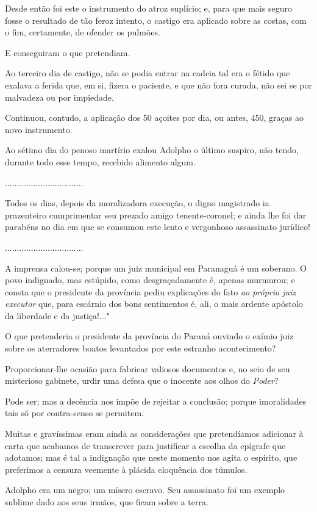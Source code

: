 Desde então foi este o instrumento do atroz suplício; e, para que mais
seguro fosse o resultado de tão feroz intento, o castigo era aplicado
sobre as costas, com o fim, certamente, de ofender os pulmões.

E conseguiram o que pretendiam.

Ao terceiro dia de castigo, não se podia entrar na cadeia tal era o
fétido que exalava a ferida que, em si, fizera o paciente, e que não
fora curada, não sei se por malvadeza ou por impiedade.

Continuou, contudo, a aplicação dos 50 açoites por dia, ou antes, 450,
graças ao novo instrumento.

Ao sétimo dia do penoso martírio exalou Adolpho o último suspiro, não
tendo, durante todo esse tempo, recebido alimento algum.

.................................

Todos os dias, depois da moralizadora execução, o digno magistrado ia
prazenteiro cumprimentar seu prezado amigo tenente-coronel; e ainda lhe
foi dar parabéns no dia em que se consumou este lento e vergonhoso
assassinato jurídico!

.................................

A imprensa calou-se; porque um juiz municipal em Paranaguá é um
soberano. O povo indignado, mas estúpido, como desgraçadamente é, apenas
murmurou; e consta que o presidente da província pediu explicações do
fato \emph{ao próprio juiz executor} que, para escárnio dos bons
sentimentos é, ali, o mais ardente apóstolo da liberdade e da
justiça!..."

O que pretenderia o presidente da província do Paraná ouvindo o exímio
juiz sobre os aterradores boatos levantados por este estranho
acontecimento?

Proporcionar-lhe ocasião para fabricar valiosos documentos e, no seio de
seu misterioso gabinete, urdir uma defesa que o inocente aos olhos do
\emph{Poder}?

Pode ser; mas a decência nos impõe de rejeitar a conclusão; porque
imoralidades tais só por contra-senso se permitem.

Muitas e gravíssimas eram ainda as considerações que pretendíamos
adicionar à carta que acabamos de transcrever para justificar a escolha
da epígrafe que adotamos; mas é tal a indignação que neste momento nos
agita o espírito, que preferimos a censura veemente à plácida eloquência
dos túmulos.

Adolpho era um negro; um mísero escravo. Seu assassinato foi um exemplo
sublime dado aos seus irmãos, que ficam sobre a terra.

